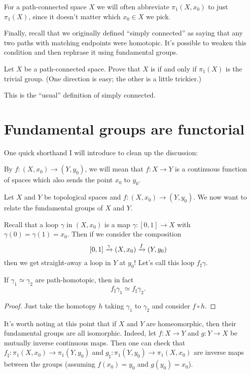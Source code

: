\begin{abuse}
	For a path-connected space $X$ we will often abbreviate $\pi_1(X, x_0)$
	to just $\pi_1(X)$, since it doesn't matter which $x_0 \in X$
	we pick.
\end{abuse}

Finally, recall that we originally defined ``simply connected'' as saying
that any two paths with matching endpoints were homotopic.
It's possible to weaken this condition and then rephrase it using
fundamental groups.
\begin{exercise}
	Let $X$ be a path-connected space.
	Prove that $X$ is  if and only if
	$\pi_1(X)$ is the trivial group.
	(One direction is easy; the other is a little trickier.)
\end{exercise}
This is the ``usual'' definition of simply connected.


\section{Fundamental groups are functorial}
One quick shorthand I will introduce to clean up the discussion:
\begin{definition}
	By $f \colon (X, x_0) \to (Y, y_0)$, we will mean that
	$f \colon X \to Y$ is a continuous function of spaces
	which also sends the point $x_0$ to $y_0$.
\end{definition}

Let $X$ and $Y$ be topological spaces and $f \colon (X, x_0) \to (Y, y_0)$.
We now want to relate the fundamental groups of $X$ and $Y$.

Recall that a loop $\gamma$ in $(X, x_0)$ is a map $\gamma \colon [0,1] \to X$
with $\gamma(0) = \gamma(1) = x_0$.
Then if we consider the composition
\[ [0,1] \xrightarrow{\gamma} (X, x_0) \xrightarrow{f} (Y, y_0) \]
then we get straight-away a loop in $Y$ at $y_0$!
Let's call this loop $f_\sharp \gamma$.
\begin{lemma}
	\label{lem:fsharp_homotopy_invariant}
	If $\gamma_1 \simeq \gamma_2$ are path-homotopic,
	then in fact
	\[ f_\sharp \gamma_1 \simeq f_\sharp \gamma_2. \]
\end{lemma}
\begin{proof}
	Just take the homotopy $h$ taking $\gamma_1$ to $\gamma_2$
	and consider $f \circ h$.
\end{proof}

It's worth noting at this point that if $X$ and $Y$ are homeomorphic,
then their fundamental groups are all isomorphic.
Indeed, let $f \colon X \to Y$ and $g \colon Y \to X$ be mutually inverse continuous maps.
Then one can check that $f_\sharp \colon \pi_1(X, x_0) \to \pi_1(Y, y_0)$
and $g_\sharp \colon \pi_1(Y, y_0) \to \pi_1(X, x_0)$ are inverse maps
between the groups (assuming $f(x_0) = y_0$ and $g(y_0) = x_0$).

